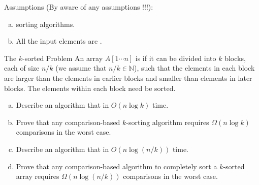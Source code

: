 \begin{frame}{}
  \centerline{\Large {}}

  \pause
  \vspace{0.30cm}

  \pause
  \vspace{0.30cm}
  \begin{alertblock}{Assumptions (By aware of any assumptions !!!):}
    \begin{enumerate}[(a)]
      \setlength{\itemsep}{5pt}
      \item {} sorting algorithms.
      \item All the input elements are .
    \end{enumerate}
  \end{alertblock}
\end{frame}

\begin{frame}{}
  \begin{exampleblock}{The $k$-sorted Problem}
    An array $A[1 \cdots n]$ is  if it can be divided into $k$ blocks, 
    each of size $n/k$ (we assume that $n/k \in \mathbb{N}$), 
    such that the elements in each block are larger than the elements 
    in earlier blocks and smaller than elements in later blocks. 
    The elements within each block need  be sorted.
  
    \begin{enumerate}[(a)]
      \item Describe an algorithm that  in $O(n \log k)$ time.    
      \item Prove that any comparison-based $k$-sorting algorithm requires $\Omega(n \log k)$ comparisons in the worst case.    
      \item Describe an algorithm that  in $O(n \log(n/k))$ time.    
      \item Prove that any comparison-based algorithm to completely sort a $k$-sorted array requires $\Omega(n \log(n/k))$ comparisons in the worst case.
    \end{enumerate}
  \end{exampleblock}
\end{frame}
